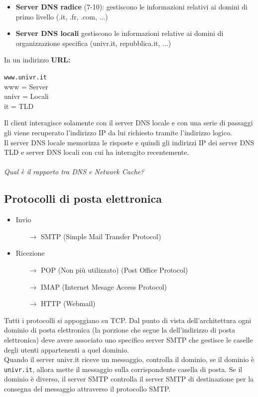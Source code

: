 \documentclass[a4paper]{article}
\begin{document}
\begin{itemize}
    \item \textbf{Server DNS radice} (7-10): gestiscono le informazioni relativi ai domini di primo livello (.it, .fr, .com, ...)
    \item \textbf{Server DNS locali} gestiscono le informazioni relative ai domini di organizzazione specifica (univr.it, repubblica.it, ...)
\end{itemize}
In un indirizzo \textbf{URL:} 
\begin{center}
  \texttt{\colorbox{red!30!white}{www}.\colorbox{blue!30!white}{univr}.\colorbox{yellow!40!white}{it}}\\
  www = Server\\
  univr = Locali\\
  it = TLD
\end{center}
Il client interagisce solamente con il server DNS locale e con una serie di passaggi gli viene recuperato l'indirizzo IP da lui richiesto tramite l'indirizzo logico.\\
Il server DNS locale memorizza le risposte e quindi gli indirizzi IP dei server DNS TLD e server DNS locali con cui ha interagito recentemente.
\\\\
\textit{Qual è il rapporto tra DNS e Network Cache?}\\

\subsection{Protocolli di posta elettronica}

\begin{itemize}
    \item Invio \begin{itemize}
        \item[$\rightarrow$] SMTP (Simple Mail Transfer Protocol)
    \end{itemize}
    \item Ricezione \begin{itemize}
        \item[$\rightarrow$] POP (Non più utilizzato) (Post Office Protocol)
        \item[$\rightarrow$] IMAP (Internet Mesage Access Protocol)
        \item[$\rightarrow$] HTTP (Webmail)
     \end{itemize}
\end{itemize}
Tutti i protocolli si appoggiano su TCP. Dal punto di vista dell'architettura ogni dominio di posta elettronica (la porzione che segue la \@ dell'indirizzo di posta elettronica) deve avere associato uno specifico server SMTP che gestisce le caselle degli utenti appartenenti a quel dominio.\\
Quando il server univr.it riceve un messaggio, controlla il dominio, se il dominio è \texttt{univr.it}, allora mette il messaggio sulla corrispondente casella di posta. Se il dominio è diverso, il server SMTP controlla il server SMTP di destinazione per la consegna del messaggio attraverso il protocollo SMTP.
\end{document}
